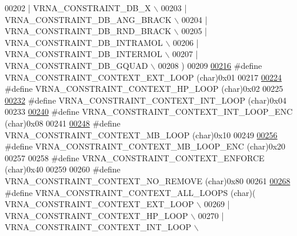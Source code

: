 \begin{DoxyCode}
00202 \textcolor{preprocessor}{      | VRNA\_CONSTRAINT\_DB\_X \(\backslash\)}
00203 \textcolor{preprocessor}{      | VRNA\_CONSTRAINT\_DB\_ANG\_BRACK \(\backslash\)}
00204 \textcolor{preprocessor}{      | VRNA\_CONSTRAINT\_DB\_RND\_BRACK \(\backslash\)}
00205 \textcolor{preprocessor}{      | VRNA\_CONSTRAINT\_DB\_INTRAMOL \(\backslash\)}
00206 \textcolor{preprocessor}{      | VRNA\_CONSTRAINT\_DB\_INTERMOL \(\backslash\)}
00207 \textcolor{preprocessor}{      | VRNA\_CONSTRAINT\_DB\_GQUAD \(\backslash\)}
00208 \textcolor{preprocessor}{    )}
00209 
\hypertarget{constraints__hard_8h_source_l00216}{}\hyperlink{group__hard__constraints_ga9418eda62a5dec070896702c279d2548}{00216} \textcolor{preprocessor}{#define VRNA\_CONSTRAINT\_CONTEXT\_EXT\_LOOP      (char)0x01}
00217 
\hypertarget{constraints__hard_8h_source_l00224}{}\hyperlink{group__hard__constraints_ga79203702b197b6b9d3b78eed40663eb1}{00224} \textcolor{preprocessor}{#define VRNA\_CONSTRAINT\_CONTEXT\_HP\_LOOP       (char)0x02}
00225 
\hypertarget{constraints__hard_8h_source_l00232}{}\hyperlink{group__hard__constraints_ga21feeab3a9e5fa5a9e3d9ac0fcf5994f}{00232} \textcolor{preprocessor}{#define VRNA\_CONSTRAINT\_CONTEXT\_INT\_LOOP      (char)0x04}
00233 
\hypertarget{constraints__hard_8h_source_l00240}{}\hyperlink{group__hard__constraints_ga0536288e04ff6332ecdc23ca4705402b}{00240} \textcolor{preprocessor}{#define VRNA\_CONSTRAINT\_CONTEXT\_INT\_LOOP\_ENC  (char)0x08}
00241 
\hypertarget{constraints__hard_8h_source_l00248}{}\hyperlink{group__hard__constraints_ga456ecd2ff00056bb64da8dd4f61bbfc5}{00248} \textcolor{preprocessor}{#define VRNA\_CONSTRAINT\_CONTEXT\_MB\_LOOP       (char)0x10}
00249 
\hypertarget{constraints__hard_8h_source_l00256}{}\hyperlink{group__hard__constraints_ga02a3d703ddbcfce393e4bbfcb9db7077}{00256} \textcolor{preprocessor}{#define VRNA\_CONSTRAINT\_CONTEXT\_MB\_LOOP\_ENC   (char)0x20}
00257 
00258 \textcolor{preprocessor}{#define VRNA\_CONSTRAINT\_CONTEXT\_ENFORCE       (char)0x40}
00259 
00260 \textcolor{preprocessor}{#define VRNA\_CONSTRAINT\_CONTEXT\_NO\_REMOVE     (char)0x80}
00261 
\hypertarget{constraints__hard_8h_source_l00268}{}\hyperlink{group__hard__constraints_ga886d9127c49bb982a4b67cd7581e8a5a}{00268} \textcolor{preprocessor}{#define VRNA\_CONSTRAINT\_CONTEXT\_ALL\_LOOPS     (char)(   VRNA\_CONSTRAINT\_CONTEXT\_EXT\_LOOP \(\backslash\)}
00269 \textcolor{preprocessor}{                                                      | VRNA\_CONSTRAINT\_CONTEXT\_HP\_LOOP \(\backslash\)}
00270 \textcolor{preprocessor}{                                                      | VRNA\_CONSTRAINT\_CONTEXT\_INT\_LOOP \(\backslash\)}

\end{DoxyCode}
